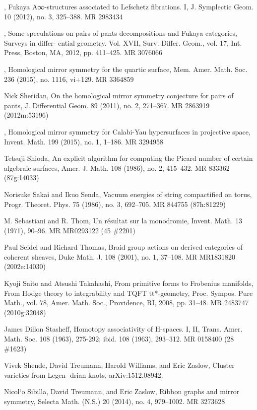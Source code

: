 {\begin{list}{}{%
  \setlength{\leftmargin}{3.4em}%
  \setlength{\itemindent}{-3.4em}%
  \setlength{\itemsep}{1.5pt}%
  \setlength{\parsep}{0pt}%
  \setlength{\listparindent}{0pt}%
}
\item[{[Sei12a]}] , Fukaya A∞-structures associated to Lefschetz fibrations. I, J. Symplectic Geom. 10 (2012), no. 3, 325--388. MR 2983434
\item[{[Sei12b]}] , Some speculations on pairs-of-pants decompositions and Fukaya categories, Surveys in differ- ential geometry. Vol. XVII, Surv. Differ. Geom., vol. 17, Int. Press, Boston, MA, 2012, pp. 411--425. MR 3076066
\item[{[Sei15]}] , Homological mirror symmetry for the quartic surface, Mem. Amer. Math. Soc. 236 (2015), no. 1116, vi+129. MR 3364859
\item[{[She11]}] Nick Sheridan, On the homological mirror symmetry conjecture for pairs of pants, J. Differential Geom. 89 (2011), no. 2, 271--367. MR 2863919 (2012m:53196)
\item[{[She15]}] , Homological mirror symmetry for Calabi-Yau hypersurfaces in projective space, Invent. Math. 199 (2015), no. 1, 1--186. MR 3294958
\item[{[Shi86]}] Tetsuji Shioda, An explicit algorithm for computing the Picard number of certain algebraic surfaces, Amer. J. Math. 108 (1986), no. 2, 415--432. MR 833362 (87g:14033)
\item[{[SS86]}] Norisuke Sakai and Ikuo Senda, Vacuum energies of string compactified on torus, Progr. Theoret. Phys. 75 (1986), no. 3, 692--705. MR 844755 (87h:81229)
\item[{[ST71]}] M. Sebastiani and R. Thom, Un résultat sur la monodromie, Invent. Math. 13 (1971), 90--96. MR MR0293122 (45 \#2201)
\item[{[ST01]}] Paul Seidel and Richard Thomas, Braid group actions on derived categories of coherent sheaves, Duke Math. J. 108 (2001), no. 1, 37--108. MR MR1831820 (2002e:14030)
\item[{[ST08]}] Kyoji Saito and Atsushi Takahashi, From primitive forms to Frobenius manifolds, From Hodge theory to integrability and TQFT tt*-geometry, Proc. Sympos. Pure Math., vol. 78, Amer. Math. Soc., Providence, RI, 2008, pp. 31--48. MR 2483747 (2010g:32048)
\item[{[Sta63]}] James Dillon Stasheff, Homotopy associativity of H-spaces. I, II, Trans. Amer. Math. Soc. 108 (1963), 275-292; ibid. 108 (1963), 293--312. MR 0158400 (28 \#1623)
\item[{[STWZ]}] Vivek Shende, David Treumann, Harold Williams, and Eric Zaslow, Cluster varieties from Legen- drian knots, arXiv:1512.08942.
\item[{[STZ14]}] Nicol`o Sibilla, David Treumann, and Eric Zaslow, Ribbon graphs and mirror symmetry, Selecta Math. (N.S.) 20 (2014), no. 4, 979--1002. MR 3273628

\end{list}}
